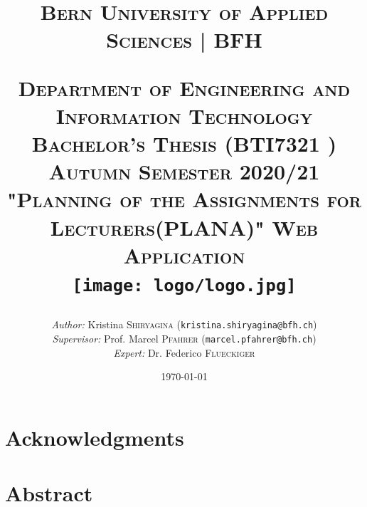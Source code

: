 \documentclass{scrartcl}
\begin{document}
\begin{titlepage}


\title{
\textsc{\LARGE Bern University of Applied Sciences | BFH }\\[0.5cm]
\begin{center}
\end{center}
\textsc{\small Department of Engineering and Information Technology}\\
\textsc{\small Bachelor's Thesis (BTI7321 ) Autumn Semester 2020/21}\\[1cm]


\textsc{\LARGE "Planning of the Assignments for Lecturers(PLANA)"  Web Application} \\[0.5cm]
 \texttt{[image: logo/logo.jpg]}\\[2ex]}

\date{\today}   %
\author{\textit{Author: }Kristina \textsc{Shiryagina} (\texttt{kristina.shiryagina@bfh.ch}) \\
 \textit{Supervisor: } Prof. Marcel \textsc{Pfahrer}  (\texttt{marcel.pfahrer@bfh.ch})\\
 \textit{Expert: } Dr. Federico \textsc {Flueckiger}   \\

 }
\maketitle	

\newpage


	
\tableofcontents
\clearpage
\end{titlepage}

\setcounter{secnumdepth}{-2}%





\section{Acknowledgments}


\section{Abstract}
\end{document}
